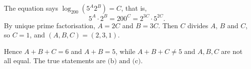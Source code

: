 The equation says $\log_{200}\left(5^A2^B\right)=C$, that is,
\[
5^A\cdot2^B=200^C=2^{3C}\cdot5^{2C}.
\]
By unique prime factorisation, $A=2C$ and $B=3C$. Then $C$ divides $A$, $B$ and $C$, so $C=1$, and $(A,B,C)=(2,3,1)$.

Hence $A+B+C=6$ and $A+B=5$, while $A+B+C\ne5$ and $A,B,C$ are not all equal. The true statements are $\boxed{\text{(b) and (c)}}$.
